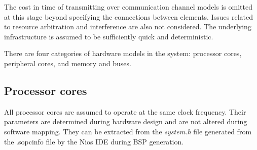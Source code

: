 \documentclass{article}
\begin{document}
The cost in time of transmitting over communication channel models is omitted at this stage beyond specifying the connections between elements. Issues related to resource arbitration and interference are also not considered. The underlying infrastructure is assumed to be sufficiently quick and deterministic.

There are four categories of hardware models in the system: processor cores, peripheral cores, and memory and buses.

\subsection{Processor cores}
All processor cores are assumed to operate at the same clock frequency. Their parameters are determined during hardware design and are not altered during software mapping. They can be extracted from the \emph{system.h} file generated from the {.sopcinfo} file by the Nios IDE during BSP generation.
\end{document}
